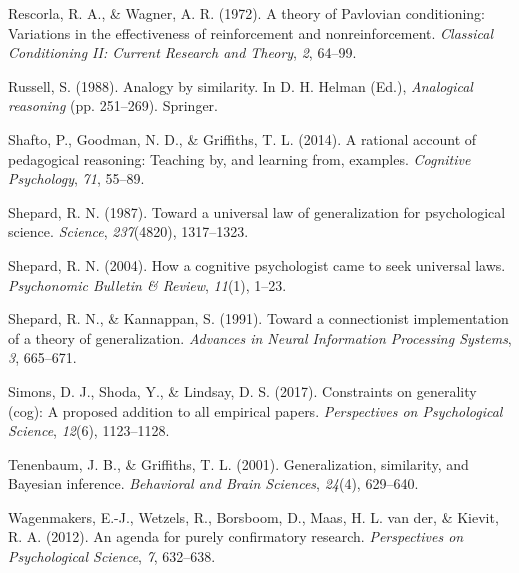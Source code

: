 \documentclass[
  english,
  doc]{apa6}
\begin{document}
\leavevmode\hypertarget{ref-rescorla1972theory}{}%
Rescorla, R. A., \& Wagner, A. R. (1972). A theory of Pavlovian conditioning: Variations in the effectiveness of reinforcement and nonreinforcement. \emph{Classical Conditioning II: Current Research and Theory}, \emph{2}, 64--99.

\leavevmode\hypertarget{ref-russell1988analogy}{}%
Russell, S. (1988). Analogy by similarity. In D. H. Helman (Ed.), \emph{Analogical reasoning} (pp. 251--269). Springer.

\leavevmode\hypertarget{ref-shafto2014rational}{}%
Shafto, P., Goodman, N. D., \& Griffiths, T. L. (2014). A rational account of pedagogical reasoning: Teaching by, and learning from, examples. \emph{Cognitive Psychology}, \emph{71}, 55--89.

\leavevmode\hypertarget{ref-shepard1987toward}{}%
Shepard, R. N. (1987). Toward a universal law of generalization for psychological science. \emph{Science}, \emph{237}(4820), 1317--1323.

\leavevmode\hypertarget{ref-shepard2004cognitive}{}%
Shepard, R. N. (2004). How a cognitive psychologist came to seek universal laws. \emph{Psychonomic Bulletin \& Review}, \emph{11}(1), 1--23.

\leavevmode\hypertarget{ref-shepard1991toward}{}%
Shepard, R. N., \& Kannappan, S. (1991). Toward a connectionist implementation of a theory of generalization. \emph{Advances in Neural Information Processing Systems}, \emph{3}, 665--671.

\leavevmode\hypertarget{ref-simons2017constraints}{}%
Simons, D. J., Shoda, Y., \& Lindsay, D. S. (2017). Constraints on generality (cog): A proposed addition to all empirical papers. \emph{Perspectives on Psychological Science}, \emph{12}(6), 1123--1128.

\leavevmode\hypertarget{ref-tenenbaum2001generalization}{}%
Tenenbaum, J. B., \& Griffiths, T. L. (2001). Generalization, similarity, and Bayesian inference. \emph{Behavioral and Brain Sciences}, \emph{24}(4), 629--640.

\leavevmode\hypertarget{ref-Wagenmakers2012}{}%
Wagenmakers, E.-J., Wetzels, R., Borsboom, D., Maas, H. L. van der, \& Kievit, R. A. (2012). An agenda for purely confirmatory research. \emph{Perspectives on Psychological Science}, \emph{7}, 632--638.
\end{document}
